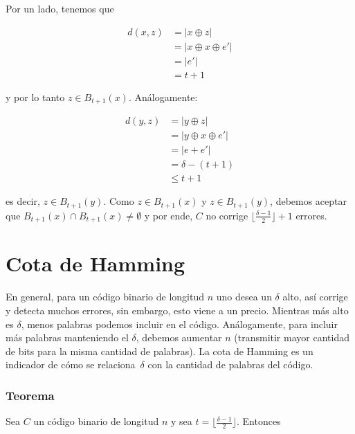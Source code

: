 \documentclass[10pt,a4paper]{article}
\begin{document}
Por un lado, tenemos que

\begin{center}
\begin{align*} d(x, z) &= \lvert x \oplus z \lvert\\ &= \lvert x \oplus x \oplus e' \rvert \\ &= \lvert e'\rvert\\ &= t + 1 \end{align*}
\end{center}

y por lo tanto $ z \in B_{t + 1} (x)$. Análogamente:

\begin{center}
\begin{align*} d(y, z) &= \lvert y \oplus z \lvert\\ &= \lvert y \oplus x \oplus e' \rvert \\ &= \lvert e + e'\rvert\\ &= \delta - (t + 1)\\ &\leq t + 1 \end{align*} 
\end{center}

es decir, $ z \in B_{t + 1} (y)$. Como $z \in B_{t + 1}(x)$ y $z \in B_{t + 1}(y)$, debemos aceptar que $B_{t + 1}(x) \cap B_{t + 1}(x) \neq \emptyset$ y por ende, $C$ no corrige $\lfloor \frac{\delta - 1}{2} \rfloor + 1$ errores.

\section*{Cota de Hamming}

En general, para un código binario de longitud $n$ uno desea un $\delta$ alto, así corrige y detecta muchos errores, sin embargo, esto viene a un precio. Mientras más alto es $\delta$, menos palabras podemos incluir en el código. Análogamente, para incluir más palabras manteniendo el $\delta$, debemos aumentar $n$ (transmitir mayor cantidad de bits para la misma cantidad de palabras). La cota de Hamming es un indicador de cómo se relaciona $\delta$ con la cantidad de palabras del código.

\subsubsection*{Teorema}

Sea $C$ un código binario de longitud $n$ y sea $t = \lfloor \frac{\delta - 1}{2}\rfloor$. Entonces
\end{document}
